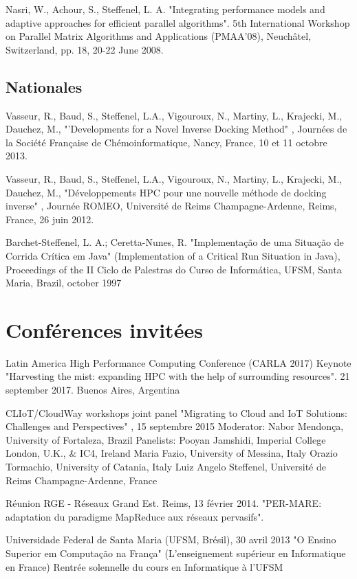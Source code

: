 \documentclass[final,twoside]{hdr} %
\begin{document}
Nasri, W., Achour, S., Steffenel, L. A. "Integrating performance models and adaptive approaches for efficient parallel algorithms". 5th International Workshop on Parallel Matrix Algorithms and Applications (PMAA'08), Neuchâtel, Switzerland, pp. 18, 20-22 June 2008. 

\subsection*{Nationales}

Vasseur, R., Baud, S., Steffenel, L.A., Vigouroux, N., Martiny, L., Krajecki, M., Dauchez, M., "'Developments for a Novel Inverse Docking Method" , Journées de la Société Française de Chémoinformatique, Nancy, France, 10 et 11 octobre 2013.

Vasseur, R., Baud, S., Steffenel, L.A., Vigouroux, N., Martiny, L., Krajecki, M., Dauchez, M., "Développements HPC pour une nouvelle méthode de docking inverse" , Journée ROMEO, Université de Reims Champagne-Ardenne, Reims, France, 26 juin 2012.

Barchet-Steffenel, L. A.; Ceretta-Nunes, R. "Implementação de uma Situação de Corrida Crítica em Java" (Implementation of a Critical Run Situation in Java), Proceedings of the II Ciclo de Palestras do Curso de Informática, UFSM, Santa Maria, Brazil, october 1997

\section*{Conférences invitées}

Latin America High Performance Computing Conference (CARLA 2017)
Keynote "Harvesting the mist: expanding HPC with the help of surrounding resources". 21 september 2017.
Buenos Aires, Argentina

CLIoT/CloudWay workshops joint panel "Migrating to Cloud and IoT Solutions: Challenges and Perspectives" , 15 septembre 2015
Moderator: Nabor Mendonça, University of Fortaleza, Brazil
Panelists:
Pooyan Jamshidi, Imperial College London, U.K., \& IC4, Ireland
Maria Fazio, University of Messina, Italy
Orazio Tormachio, University of Catania, Italy
Luiz Angelo Steffenel, Université de Reims Champagne-Ardenne, France


Réunion RGE - Réseaux Grand Est. Reims, 13 février 2014.
"PER-MARE: adaptation du paradigme MapReduce aux réseaux pervasifs".

Universidade Federal de Santa Maria (UFSM, Brésil), 30 avril 2013
"O Ensino Superior em Computação na França" (L'enseignement supérieur en Informatique en France)
Rentrée solennelle du cours en Informatique à l'UFSM
\end{document}

